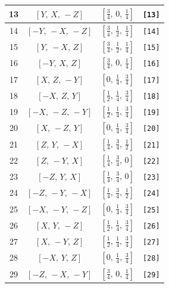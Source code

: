 \documentclass[fleqn,8pt]{jsarticle}
\begin{document}
\begin{longtable}{cccc}
13 & $\left[ Y,\, X,\, - Z \right]$ & $\left[ \frac{3}{4},\, 0,\, \frac{1}{4} \right]$ & {\tt [13]} \\ \hline
14 & $\left[ - Y,\, - X,\, - Z \right]$ & $\left[ \frac{3}{4},\, \frac{1}{2},\, \frac{1}{4} \right]$ & {\tt [14]} \\ \hline
15 & $\left[ Y,\, - X,\, Z \right]$ & $\left[ \frac{3}{4},\, \frac{1}{2},\, \frac{1}{4} \right]$ & {\tt [15]} \\ \hline
16 & $\left[ - Y,\, X,\, Z \right]$ & $\left[ \frac{3}{4},\, 0,\, \frac{1}{4} \right]$ & {\tt [16]} \\ \hline
17 & $\left[ X,\, Z,\, - Y \right]$ & $\left[ 0,\, \frac{1}{4},\, \frac{3}{4} \right]$ & {\tt [17]} \\ \hline
18 & $\left[ - X,\, Z,\, Y \right]$ & $\left[ \frac{1}{2},\, \frac{1}{4},\, \frac{3}{4} \right]$ & {\tt [18]} \\ \hline
19 & $\left[ - X,\, - Z,\, - Y \right]$ & $\left[ \frac{1}{2},\, \frac{1}{4},\, \frac{3}{4} \right]$ & {\tt [19]} \\ \hline
20 & $\left[ X,\, - Z,\, Y \right]$ & $\left[ 0,\, \frac{1}{4},\, \frac{3}{4} \right]$ & {\tt [20]} \\ \hline
21 & $\left[ Z,\, Y,\, - X \right]$ & $\left[ \frac{1}{4},\, \frac{3}{4},\, \frac{1}{2} \right]$ & {\tt [21]} \\ \hline
22 & $\left[ Z,\, - Y,\, X \right]$ & $\left[ \frac{1}{4},\, \frac{3}{4},\, 0 \right]$ & {\tt [22]} \\ \hline
23 & $\left[ - Z,\, Y,\, X \right]$ & $\left[ \frac{1}{4},\, \frac{3}{4},\, 0 \right]$ & {\tt [23]} \\ \hline
24 & $\left[ - Z,\, - Y,\, - X \right]$ & $\left[ \frac{1}{4},\, \frac{3}{4},\, \frac{1}{2} \right]$ & {\tt [24]} \\ \hline
25 & $\left[ - X,\, - Y,\, - Z \right]$ & $\left[ 0,\, \frac{1}{4},\, \frac{3}{4} \right]$ & {\tt [25]} \\ \hline
26 & $\left[ X,\, Y,\, - Z \right]$ & $\left[ \frac{1}{2},\, \frac{1}{4},\, \frac{3}{4} \right]$ & {\tt [26]} \\ \hline
27 & $\left[ X,\, - Y,\, Z \right]$ & $\left[ \frac{1}{2},\, \frac{1}{4},\, \frac{3}{4} \right]$ & {\tt [27]} \\ \hline
28 & $\left[ - X,\, Y,\, Z \right]$ & $\left[ 0,\, \frac{1}{4},\, \frac{3}{4} \right]$ & {\tt [28]} \\ \hline
29 & $\left[ - Z,\, - X,\, - Y \right]$ & $\left[ \frac{3}{4},\, 0,\, \frac{1}{4} \right]$ & {\tt [29]} \\ \hline

\end{longtable}
\end{document}
